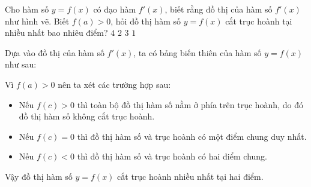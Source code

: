 \begin{ex}%
 \immini
 {
 Cho hàm số $y = f(x)$ có đạo hàm $f'(x)$, biết rằng đồ thị của hàm số $f'(x)$ như hình vẽ. Biết $f(a) > 0$, hỏi đồ thị hàm số $y = f(x)$ cắt trục hoành tại nhiều nhất bao nhiêu điểm?
 \motcot
  {$4$}
  {\True $2$}
  {$3$}
  {$1$}
 }
 {
 }

 \loigiai
  {
  Dựa vào đồ thị của hàm số $f'(x)$, ta có bảng biến thiên của hàm số $y = f(x)$ như sau:
  \begin{center}
  \end{center}
  Vì $f(a) > 0$ nên ta xét các trường hợp sau:
  \begin{itemize}
   \item Nếu $f(c) > 0$ thì toàn bộ đồ thị hàm số nằm ở phía trên trục hoành, do đó đồ thị hàm số không cắt trục hoành.
   \item Nếu $f(c) = 0$ thì đồ thị hàm số và trục hoành có một điểm chung duy nhất.
   \item Nếu $f(c) < 0$ thì đồ thị hàm số và trục hoành có hai điểm chung.
  \end{itemize}
  Vậy đồ thị hàm số $y = f(x)$ cắt trục hoành nhiều nhất tại hai điểm.
  }
\end{ex}

